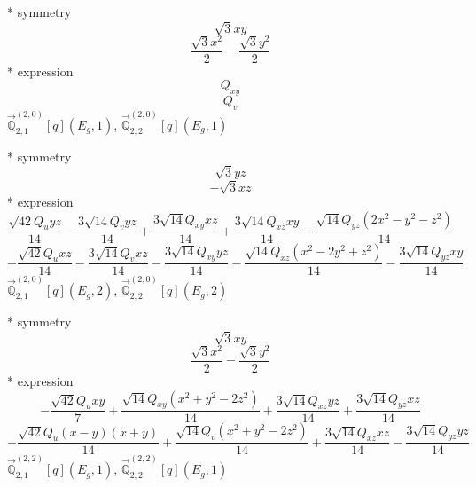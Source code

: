 \documentclass[fleqn,8pt]{jsarticle}
\begin{document}
\noindent\quad ** symmetry
\begin{dmath*}
\sqrt{3} x y
\end{dmath*}
\begin{dmath*}
\frac{\sqrt{3} x^{2}}{2} - \frac{\sqrt{3} y^{2}}{2}
\end{dmath*}
\noindent\quad ** expression
\begin{dmath*}
Q_{xy}
\end{dmath*}
\begin{dmath*}
Q_{v}
\end{dmath*}
\noindent\quad $\vec{\mathbb{Q}}_{2,1}^{(2,0)}[q](E_{g},1)$, $\vec{\mathbb{Q}}_{2,2}^{(2,0)}[q](E_{g},1)$

\noindent\quad ** symmetry
\begin{dmath*}
\sqrt{3} y z
\end{dmath*}
\begin{dmath*}
- \sqrt{3} x z
\end{dmath*}
\noindent\quad ** expression
\begin{dmath*}
\frac{\sqrt{42} Q_{u} y z}{14} - \frac{3 \sqrt{14} Q_{v} y z}{14} + \frac{3 \sqrt{14} Q_{xy} x z}{14} + \frac{3 \sqrt{14} Q_{xz} x y}{14} - \frac{\sqrt{14} Q_{yz} \left(2 x^{2} - y^{2} - z^{2}\right)}{14}
\end{dmath*}
\begin{dmath*}
- \frac{\sqrt{42} Q_{u} x z}{14} - \frac{3 \sqrt{14} Q_{v} x z}{14} - \frac{3 \sqrt{14} Q_{xy} y z}{14} - \frac{\sqrt{14} Q_{xz} \left(x^{2} - 2 y^{2} + z^{2}\right)}{14} - \frac{3 \sqrt{14} Q_{yz} x y}{14}
\end{dmath*}
\noindent\quad $\vec{\mathbb{Q}}_{2,1}^{(2,0)}[q](E_{g},2)$, $\vec{\mathbb{Q}}_{2,2}^{(2,0)}[q](E_{g},2)$

\noindent\quad ** symmetry
\begin{dmath*}
\sqrt{3} x y
\end{dmath*}
\begin{dmath*}
\frac{\sqrt{3} x^{2}}{2} - \frac{\sqrt{3} y^{2}}{2}
\end{dmath*}
\noindent\quad ** expression
\begin{dmath*}
- \frac{\sqrt{42} Q_{u} x y}{7} + \frac{\sqrt{14} Q_{xy} \left(x^{2} + y^{2} - 2 z^{2}\right)}{14} + \frac{3 \sqrt{14} Q_{xz} y z}{14} + \frac{3 \sqrt{14} Q_{yz} x z}{14}
\end{dmath*}
\begin{dmath*}
- \frac{\sqrt{42} Q_{u} \left(x - y\right) \left(x + y\right)}{14} + \frac{\sqrt{14} Q_{v} \left(x^{2} + y^{2} - 2 z^{2}\right)}{14} + \frac{3 \sqrt{14} Q_{xz} x z}{14} - \frac{3 \sqrt{14} Q_{yz} y z}{14}
\end{dmath*}
\noindent\quad $\vec{\mathbb{Q}}_{2,1}^{(2,2)}[q](E_{g},1)$, $\vec{\mathbb{Q}}_{2,2}^{(2,2)}[q](E_{g},1)$
\end{document}
